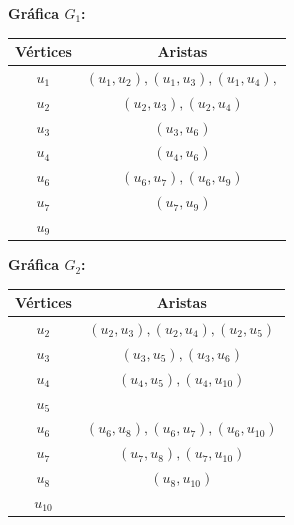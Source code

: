 \documentclass[12pt]{article}
\begin{document}
\begin{enumerate}
\begin{enumerate}
	      \textbf{Gráfica \( G_1 \):}
	      \begin{center}
		      \begin{tabular}{|c|c|}
			      \hline
			      Vértices  & Aristas                                    \\
			      \hline
			      \( u_1 \) & \( (u_1, u_2), (u_1, u_3) , (u_1, u_4), \) \\
			      \( u_2 \) & \( (u_2, u_3), (u_2, u_4) \)               \\
			      \( u_3 \) & \( (u_3, u_6) \)                           \\
			      \( u_4 \) & \( (u_4, u_6) \)                           \\
			      \( u_6 \) & \( (u_6, u_7) , (u_6,u_9) \)               \\
			      \( u_7 \) & \( (u_7, u_9) \)                           \\
			      \( u_9 \) & \( \)                                      \\
			      \hline
		      \end{tabular}
	      \end{center}

	      \vspace{1em} %

	      \textbf{Gráfica \( G_2 \):}
	      \begin{center}
		      \begin{tabular}{|c|c|}
			      \hline
			      Vértices     & Aristas                                   \\
			      \hline
			      \( u_2 \)    & \( (u_2, u_3), (u_2, u_4), (u_2,u_5) \)   \\
			      \( u_3 \)    & \( (u_3, u_5), (u_3,u_6) \)               \\
			      \( u_4 \)    & \( (u_4, u_5), (u_4,u_{10}) \)            \\
			      \( u_5 \)    & \(  \)                                    \\
			      \( u_6 \)    & \( (u_6, u_8) , (u_6,u_7), (u_6,u_{10})\) \\
			      \( u_7 \)    & \( (u_7, u_8) , (u_7,u_{10}) \)           \\
			      \( u_8 \)    & \( (u_8, u_{10}) \)                       \\
			      \( u_{10} \) & \(  \)                                    \\
			      \hline
		      \end{tabular}
	      \end{center}


\end{enumerate}
\end{enumerate}
\end{document}
